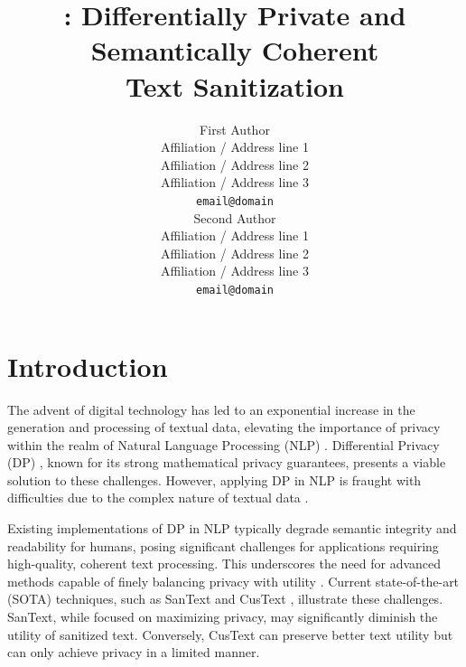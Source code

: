 \documentclass[11pt]{article}
\title{\clusant: Differentially Private and Semantically Coherent \\Text Sanitization}
\author{First Author \\
  Affiliation / Address line 1 \\
  Affiliation / Address line 2 \\
  Affiliation / Address line 3 \\
  \texttt{email@domain} \\\And
  Second Author \\
  Affiliation / Address line 1 \\
  Affiliation / Address line 2 \\
  Affiliation / Address line 3 \\
  \texttt{email@domain} \\}
\begin{document}
\maketitle








\section{Introduction}

The advent of digital technology has led to an exponential increase in the generation and processing of textual data, elevating the importance of privacy within the realm of Natural Language Processing (NLP) \cite{carlini2021extracting, jegorova2022survey}.  
Differential Privacy (DP) \cite{dwork2006differential}, known for its strong mathematical privacy guarantees, presents a viable solution to these challenges. However, applying DP in NLP is fraught with difficulties due to the complex nature of textual data %
\cite{song2020information}.

Existing implementations of DP in NLP typically degrade semantic integrity and readability for humans, posing significant challenges for applications requiring high-quality, coherent text processing. This underscores the need for advanced methods capable of finely balancing privacy with utility \cite{lyu2020towards,anil2021large,dupuy2022efficient, li2018towards,mireshghallah2021privacy}. 
Current state-of-the-art (SOTA) techniques, such as SanText \cite{yue2021differential} and CusText \cite{chen2023customized}, illustrate these challenges. SanText, while focused on maximizing privacy, may significantly diminish the utility of sanitized text. Conversely, CusText can preserve better text utility  but can only achieve privacy in a limited manner. 

\end{document}
